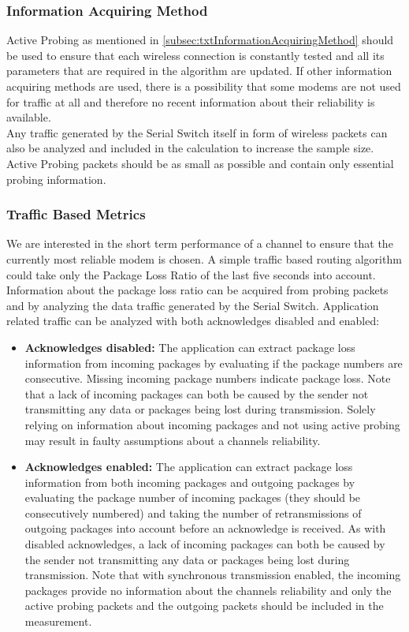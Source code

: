 \subsubsection{Information Acquiring Method}
Active Probing as mentioned in \autoref{subsec:txtInformationAcquiringMethod} should be used to ensure that each wireless connection is constantly tested and all its parameters that are required in the algorithm are updated. If other information acquiring methods are used, there is a possibility that some modems are not used for traffic at all and therefore no recent information about their reliability is available.\\
Any traffic generated by the Serial Switch itself in form of wireless packets can also be analyzed and included in the calculation to increase the sample size.\\
Active Probing packets should be as small as possible and contain only essential probing information. 
%
\subsubsection{Traffic Based Metrics}
We are interested in the short term performance of a channel to ensure that the currently most reliable modem is chosen. A simple traffic based routing algorithm could take only the Package Loss Ratio of the last five seconds into account. \\
Information about the package loss ratio can be acquired from probing packets and by analyzing the data traffic generated by the Serial Switch. Application related traffic can be analyzed with both acknowledges disabled and enabled: 
\begin{itemize}
    \item \textbf{Acknowledges disabled:} The application can extract package loss information from incoming packages by evaluating if the package numbers are consecutive. Missing incoming package numbers indicate package loss. Note that a lack of incoming packages can both be caused by the sender not transmitting any data or packages being lost during transmission. Solely relying on information about incoming packages and not using active probing may result in faulty assumptions about a channels reliability.
    \item \textbf{Acknowledges enabled:} The application can extract package loss information from both incoming packages and outgoing packages by evaluating the package number of incoming packages (they should be consecutively numbered) and taking the number of retransmissions of outgoing packages into account before an acknowledge is received. As with disabled acknowledges, a lack of incoming packages can both be caused by the sender not transmitting any data or packages being lost during transmission. Note that with synchronous transmission enabled, the incoming packages provide no information about the channels reliability and only the active probing packets and the outgoing packets should be included in the measurement.
\end{itemize}
%
